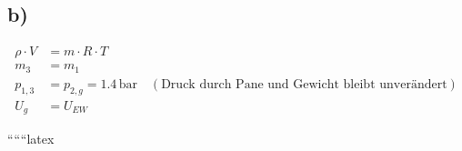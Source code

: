 

\subsection*{b)}

\begin{align*}
    \rho \cdot V & = m \cdot R \cdot T \\
    m_{3} & = m_{1} \\
    p_{1,3} & = p_{2,g} = 1.4 \, \text{bar} \quad (\text{Druck durch Pane und Gewicht bleibt unverändert}) \\
    U_{g} & = U_{EW}
\end{align*}

``````latex